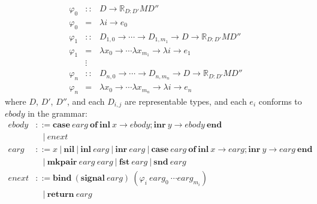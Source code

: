 \documentclass{article}[11pt]
\begin{document}
\begin{eqnarray*}
\varphi_0 &::& D \rightarrow \mathbb{R}_{D:D'} M D''\\
\varphi_0 &=& \lambda i \rightarrow e_0\\
\varphi_1 &::& D_{1,0} \rightarrow \cdots \rightarrow D_{1,m_1} \rightarrow D \rightarrow \mathbb{R}_{D:D'} M D''\\
\varphi_1 &=& \lambda x_0 \rightarrow \cdots \lambda x_{m_1} \rightarrow \lambda i \rightarrow e_1\\
          &\vdots&\\
\varphi_n &::& D_{n,0} \rightarrow \cdots \rightarrow D_{n,m_n} \rightarrow D \rightarrow \mathbb{R}_{D:D'} M D''\\
\varphi_n &=& \lambda x_0 \rightarrow \cdots \lambda x_{m_n} \rightarrow \lambda i \rightarrow e_n
\end{eqnarray*}
%
where $D$, $D'$, $D''$, and each $D_{i,j}$ are representable types, and each $e_i$ conforms to $\mathit{ebody}$ in the grammar:
%
$$
\begin{aligned}
\mathit{ebody} &::= \mathbf{case}~ \mathit{earg}~ \mathbf{of}~ \mathbf{inl}~ x \rightarrow \mathit{ebody} ; \mathbf{inr}~ y \rightarrow \mathit{ebody}~ \mathbf{end}\\
               &~~~~|~ \mathit{enext}\\
\mathit{earg}  &::= \mathit{x}~ |~ \mathbf{nil}~ |~ \mathbf{inl}~ \mathit{earg}~ |~ \mathbf{inr}~ \mathit{earg}~ |~ \mathbf{case}~ \mathit{earg}~ \mathbf{of}~ \mathbf{inl}~ x \rightarrow \mathit{earg} ; \mathbf{inr}~ y \rightarrow \mathit{earg}~ \mathbf{end}\\
               &~~~~|~ \mathbf{mkpair}~ \mathit{earg}~ \mathit{earg}~ |~ \mathbf{fst}~ \mathit{earg}~ |~ \mathbf{snd}~ \mathit{earg}\\
\mathit{enext} &::= \mathbf{bind}~ (\mathbf{signal}~ \mathit{earg})~ (\varphi_i~ \mathit{earg}_0~ \cdots \mathit{earg}_{m_i})\\
               &~~~~|~ \mathbf{return}~ \mathit{earg}
\end{aligned}
$$
\end{document}
